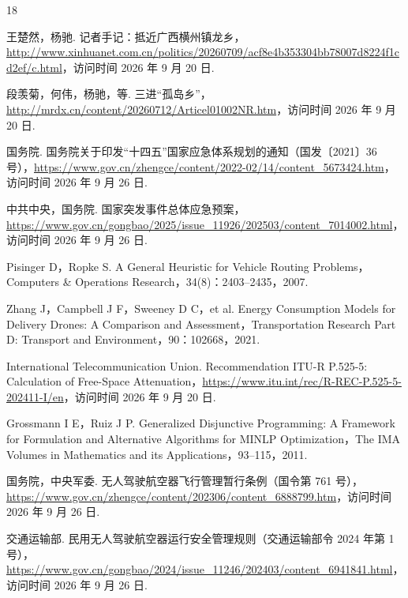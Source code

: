 \begin{thebibliography}{18}
\setlength{\itemsep}{1pt}
\setlength{\parskip}{0pt}


王楚然，杨驰. 记者手记：抵近广西横州镇龙乡，\url{http://www.xinhuanet.com.cn/politics/20260709/acf8e4b353304bb78007d8224f1cd2ef/c.html}，访问时间 2026 年 9 月 20 日.

段羡菊，何伟，杨驰，等. 三进“孤岛乡”，\url{http://mrdx.cn/content/20260712/Articel01002NR.htm}，访问时间 2026 年 9 月 20 日.

国务院. 国务院关于印发“十四五”国家应急体系规划的通知（国发〔2021〕36号），\url{https://www.gov.cn/zhengce/content/2022-02/14/content_5673424.htm}，访问时间 2026 年 9 月 26 日.

中共中央，国务院. 国家突发事件总体应急预案，\url{https://www.gov.cn/gongbao/2025/issue_11926/202503/content_7014002.html}，访问时间 2026 年 9 月 26 日.


Pisinger D，Ropke S. A General Heuristic for Vehicle Routing Problems，Computers \& Operations Research，34(8)：2403--2435，2007.

Zhang J，Campbell J F，Sweeney D C，et al. Energy Consumption Models for Delivery Drones: A Comparison and Assessment，Transportation Research Part D: Transport and Environment，90：102668，2021.

International Telecommunication Union. Recommendation ITU-R P.525-5: Calculation of Free-Space Attenuation，\url{https://www.itu.int/rec/R-REC-P.525-5-202411-I/en}，访问时间 2026 年 9 月 20 日.

Grossmann I E，Ruiz J P. Generalized Disjunctive Programming: A Framework for Formulation and Alternative Algorithms for MINLP Optimization，The IMA Volumes in Mathematics and its Applications，93--115，2011.


国务院，中央军委. 无人驾驶航空器飞行管理暂行条例（国令第 761 号），\url{https://www.gov.cn/zhengce/content/202306/content_6888799.htm}，访问时间 2026 年 9 月 26 日.

交通运输部. 民用无人驾驶航空器运行安全管理规则（交通运输部令 2024 年第 1 号），\url{https://www.gov.cn/gongbao/2024/issue_11246/202403/content_6941841.html}，访问时间 2026 年 9 月 26 日.


\end{thebibliography}
